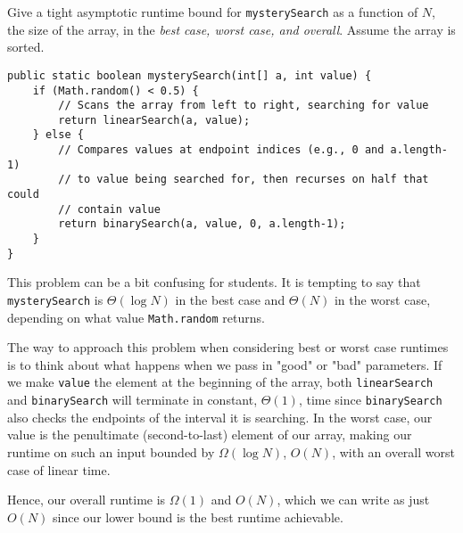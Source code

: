 \begin{blocksection}
\question Give a tight asymptotic runtime bound for \lstinline$mysterySearch$
as a function of $N$, the size of the array, in the \emph{best case, worst
case, and overall}. Assume the array is sorted.

\begin{lstlisting}
public static boolean mysterySearch(int[] a, int value) {
    if (Math.random() < 0.5) {
        // Scans the array from left to right, searching for value
        return linearSearch(a, value);
    } else {
        // Compares values at endpoint indices (e.g., 0 and a.length-1)
        // to value being searched for, then recurses on half that could 
        // contain value
        return binarySearch(a, value, 0, a.length-1);
    }
}
\end{lstlisting}

\begin{solution}[0.5in]
This problem can be a bit confusing for students. It is tempting to say that 
\lstinline$mysterySearch$ is $\Theta(\log{N})$ in the best case and $\Theta(N)$ in 
the worst case, depending on what value \lstinline{Math.random} returns.

The way to approach this problem when considering best or worst case runtimes is to think about what happens when we pass in "good" or "bad" parameters.
If we make \lstinline{value} the element at the beginning of the array, both
\lstinline{linearSearch} and \lstinline{binarySearch} will terminate in constant, $\Theta(1)$, time
since \lstinline{binarySearch} also checks the endpoints of the interval it is searching.
In the worst case, our value is the penultimate (second-to-last) element of our array, making our runtime on such an input bounded by
$\Omega(\log{N})$, $O(N)$, with an overall worst case of linear time.

Hence, our overall runtime is $\Omega(1)$ and $O(N)$, which we can write as just $O(N)$ since our lower bound is the best runtime achievable.
\end{solution}
\end{blocksection}

